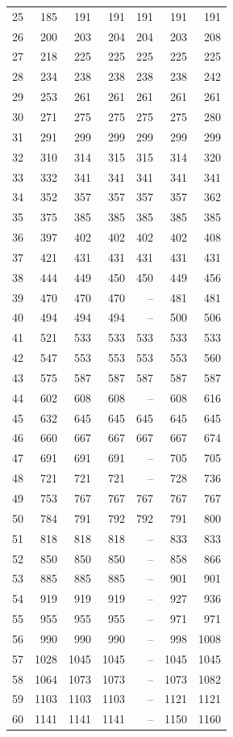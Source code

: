 \begin{longtable}{rrrrrrr}
25 & 185 & 191 & 191 & 191 & 191 & 191 \\
26 & 200 & 203 & 204 & 204 & 203 & 208 \\
27 & 218 & 225 & 225 & 225 & 225 & 225 \\
28 & 234 & 238 & 238 & 238 & 238 & 242 \\
29 & 253 & 261 & 261 & 261 & 261 & 261 \\
30 & 271 & 275 & 275 & 275 & 275 & 280 \\
31 & 291 & 299 & 299 & 299 & 299 & 299 \\
32 & 310 & 314 & 315 & 315 & 314 & 320 \\
33 & 332 & 341 & 341 & 341 & 341 & 341 \\
34 & 352 & 357 & 357 & 357 & 357 & 362 \\
35 & 375 & 385 & 385 & 385 & 385 & 385 \\
36 & 397 & 402 & 402 & 402 & 402 & 408 \\
37 & 421 & 431 & 431 & 431 & 431 & 431 \\
38 & 444 & 449 & 450 & 450 & 449 & 456 \\
39 & 470 & 470 & 470 & -- & 481 & 481 \\
40 & 494 & 494 & 494 & -- & 500 & 506 \\
41 & 521 & 533 & 533 & 533 & 533 & 533 \\
42 & 547 & 553 & 553 & 553 & 553 & 560 \\
43 & 575 & 587 & 587 & 587 & 587 & 587 \\
44 & 602 & 608 & 608 & -- & 608 & 616 \\
45 & 632 & 645 & 645 & 645 & 645 & 645 \\
46 & 660 & 667 & 667 & 667 & 667 & 674 \\
47 & 691 & 691 & 691 & -- & 705 & 705 \\
48 & 721 & 721 & 721 & -- & 728 & 736 \\
49 & 753 & 767 & 767 & 767 & 767 & 767 \\
50 & 784 & 791 & 792 & 792 & 791 & 800 \\
51 & 818 & 818 & 818 & -- & 833 & 833 \\
52 & 850 & 850 & 850 & -- & 858 & 866 \\
53 & 885 & 885 & 885 & -- & 901 & 901 \\
54 & 919 & 919 & 919 & -- & 927 & 936 \\
55 & 955 & 955 & 955 & -- & 971 & 971 \\
56 & 990 & 990 & 990 & -- & 998 & 1008 \\
57 & 1028 & 1045 & 1045 & -- & 1045 & 1045 \\
58 & 1064 & 1073 & 1073 & -- & 1073 & 1082 \\
59 & 1103 & 1103 & 1103 & -- & 1121 & 1121 \\
60 & 1141 & 1141 & 1141 & -- & 1150 & 1160 \\
\end{longtable}
\endgroup
